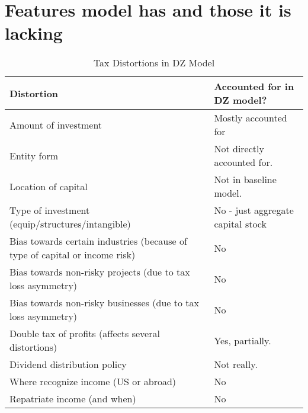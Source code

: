 \section{Features model has and those it is lacking}


\begin{table}[htbp]
  \centering
  \caption{Tax Distortions in DZ Model}
    \begin{tabular}{ll}
    \hline
    \hline
    Distortion & Accounted for in DZ model? \\
    \hline
    Amount of investment & Mostly accounted for \\
    Entity form & Not directly accounted for.  \\
    Location of capital & Not in baseline model. \\
    Type of investment (equip/structures/intangible) & No - just aggregate capital stock \\
    Bias towards certain industries (because of type of capital or income risk) & No \\
    Bias towards non-risky projects (due to tax loss asymmetry) & No \\
    Bias towards non-risky businesses (due to tax loss asymmetry) & No \\
    Double tax of profits (affects several distortions) & Yes, partially. \\
    Dividend distribution policy & Not really.   \\
    Where recognize income (US or abroad) & No \\
    Repatriate income (and when) & No \\
     \hline
    \hline
    \end{tabular}%
  \label{tab:tax_distortions}%
\end{table}%




